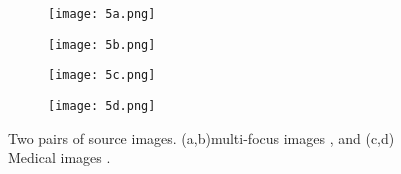 \begin{figure}[ht] 
  \begin{subfigure}[b]{0.25\linewidth}
    \centering
    \texttt{[image: 5a.png]}
    \caption{} 
    \label{1a} 
    \vspace{4ex}
  \end{subfigure}%
  \begin{subfigure}[b]{0.25\linewidth}
    \centering
    \texttt{[image: 5b.png]}
    \caption{} 
    \label{1b} 
    \vspace{4ex}
  \end{subfigure}%
  \begin{subfigure}[b]{0.25\linewidth}
    \centering
    \texttt{[image: 5c.png]} 
    \caption{} 
    \label{1c} 
    \vspace{4ex}
  \end{subfigure}%
  \begin{subfigure}[b]{0.25\linewidth}
    \centering
    \texttt{[image: 5d.png]}
    \caption{} 
    \label{1d} 
    \vspace{4ex}
  \end{subfigure}%
  \caption{Two pairs of source images. (a,b)multi-focus images , and (c,d)  Medical images .}
  \label{advntg} 
\end{figure}

